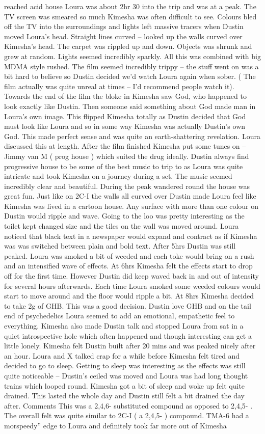 \documentclass[12pt]{book}
\begin{document}
reached acid house Loura was about 2hr 30 into the trip and was at a peak. The TV screen was smeared so much Kimesha was often difficult to see. Colours bled off the TV into the surroundings and lights left massive tracers when Dustin moved Loura's head. Straight lines curved -- looked up the walls curved over Kimesha's head. The carpet was rippled up and down. Objects was shrunk and grew at random. Lights seemed incredibly sparkly. All this was combined with big MDMA style rushed. The film seemed incredibly trippy -- the stuff went on was a bit hard to believe so Dustin decided we'd watch Loura again when sober. ( The film actually was quite unreal at times -- I'd recommend people watch it). Towards the end of the film the bloke in Kimesha saw God, who happened to look exactly like Dustin. Then someone said something about God made man in Loura's own image. This flipped Kimesha totally as Dustin decided that God must look like Loura and so in some way Kimesha was actually Dustin's own God. This made perfect sense and was quite an earth-shattering revelation. Loura discussed this at length. After the film finished Kimesha put some tunes on -- Jimmy van M ( prog house ) which suited the drug ideally. Dustin always find progressive house to be some of the best music to trip to as Loura was quite intricate and took Kimesha on a journey during a set. The music seemed incredibly clear and beautiful. During the peak wandered round the house was great fun. Just like on 2C-I the walls all curved over Dustin made Loura feel like Kimesha was lived in a cartoon house. Any surface with more than one colour on Dustin would ripple and wave. Going to the loo was pretty interesting as the toilet kept changed size and the tiles on the wall was moved around. Loura noticed that black text in a newspaper would expand and contract as if Kimesha was was switched between plain and bold text. After 5hrs Dustin was still peaked. Loura was smoked a bit of weeded and each toke would bring on a rush and an intensified wave of effects. At 6hrs Kimesha felt the effects start to drop off for the first time. However Dustin did keep waved back in and out of intensity for several hours afterwards. Each time Loura smoked some weeded colours would start to move around and the floor would ripple a bit. At 8hrs Kimesha decided to take 2g of GHB. This was a good decision. Dustin love GHB and on the tail end of psychedelics Loura seemed to add an emotional, empathetic feel to everything. Kimesha also made Dustin talk and stopped Loura from sat in a quiet introspective hole which often happened and though interesting can get a little lonely. Kimesha felt Dustin built after 20 mins and was peaked nicely after an hour. Loura and X talked crap for a while before Kimesha felt tired and decided to go to sleep. Getting to sleep was interesting as the effects was still quite noticeable -- Dustin's ceiled was moved and Loura was had long thought trains which looped round. Kimesha got a bit of sleep and woke up felt quite drained. This lasted the whole day and Dustin still felt a bit drained the day after. Comments This was a 2,4,6- substituted compound as opposed to 2,4,5- . The overall felt was quite similar to 2C-I ( a 2,4,5- ) compound. TMA-6 had a morspeedy'' edge to Loura and definitely took far more out of Kimesha 
\end{document}
